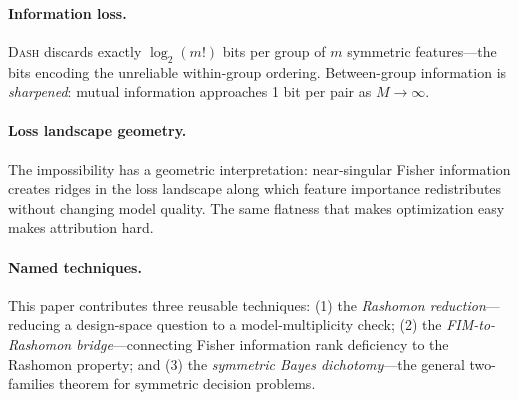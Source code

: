 \documentclass{jmlr}
\newcommand{\DASH}{\textsc{Dash}}
\begin{document}
\paragraph{Information loss.}
\DASH{} discards exactly $\log_2(m!)$ bits per group of $m$ symmetric features---the bits encoding the unreliable within-group ordering. Between-group information is \emph{sharpened}: mutual information approaches 1 bit per pair as $M \to \infty$.

\paragraph{Loss landscape geometry.}
The impossibility has a geometric interpretation: near-singular Fisher information creates ridges in the loss landscape along which feature importance redistributes without changing model quality. The same flatness that makes optimization easy makes attribution hard.

\paragraph{Named techniques.}
This paper contributes three reusable techniques: (1) the \emph{Rashomon reduction}---reducing a design-space question to a model-multiplicity check; (2) the \emph{FIM-to-Rashomon bridge}---connecting Fisher information rank deficiency to the Rashomon property; and (3) the \emph{symmetric Bayes dichotomy}---the general two-families theorem for symmetric decision problems.
\end{document}
